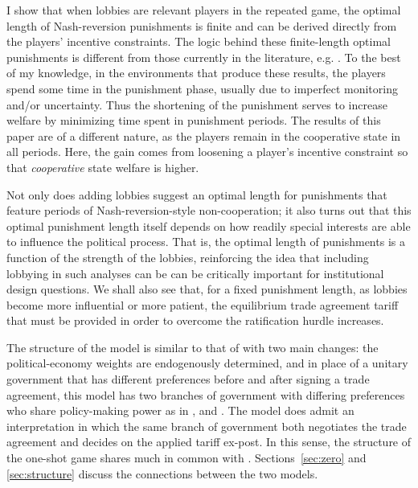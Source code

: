 \documentclass[authoryear, review]{elsarticle}
\begin{document}
I show that when lobbies are relevant players in the repeated game, the optimal length of Nash-reversion punishments is finite and can be derived directly from the players' incentive constraints. The logic behind these finite-length optimal punishments is different from those currently in the literature, e.g. \citet{greenporter}. To the best of my knowledge, in the environments that produce these results, the players spend some time in the punishment phase, usually due to imperfect monitoring and/or uncertainty. Thus the shortening of the punishment serves to increase welfare by minimizing time spent in punishment periods. The results of this paper are of a different nature, as the players remain in the cooperative state in all periods. Here, the gain comes from loosening a player's incentive constraint so that \textit{cooperative} state welfare is higher.

Not only does adding lobbies suggest an optimal length for punishments that feature periods of Nash-reversion-style non-cooperation; it also turns out that this optimal punishment length itself depends on how readily special interests are able to influence the political process. That is, the optimal length of punishments is a function of the strength of the lobbies, reinforcing the idea that including lobbying in such analyses can be can be critically important for institutional design questions. We shall also see that, for a fixed punishment length, as lobbies become more influential or more patient, the equilibrium trade agreement tariff that must be provided in order to overcome the ratification hurdle increases. 

The structure of the model is similar to that of \citet{bs2005} with two main changes: the political-economy weights are endogenously determined, and in place of a unitary government that has different preferences before and after signing a trade agreement, this model has two branches of government with differing preferences who share policy-making power as in \citet{mr97}, \citet{song} and \citet{buzard2013b}. The model does admit an interpretation in which the same branch of government both negotiates the trade agreement and decides on the applied tariff ex-post. In this sense, the structure of the one-shot game shares much in common with \citet{mrc2007}. Sections~\ref{sec:zero} and \ref{sec:structure} discuss the connections between the two models.
\end{document}
